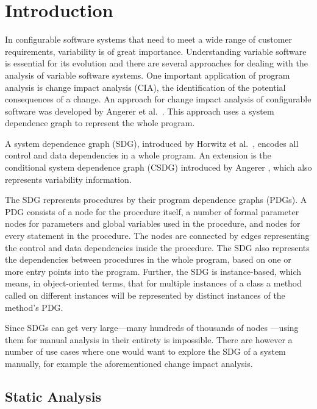 \chapter{Introduction}

In configurable software systems that need to meet a wide range of customer requirements, variability is of great 
importance. Understanding variable software is essential for its evolution and there are several approaches for dealing 
with the analysis of variable software systems. One important application of program analysis is change impact analysis 
(CIA), the identification of the potential consequences of a change. An approach for change impact analysis of 
configurable software was developed by Angerer et al.\ \cite{DBLP:conf/kbse/AngererGPG15}. This approach uses a system 
dependence graph to represent the whole program.

A system dependence graph (SDG), introduced by Horwitz et al.\ \cite{DBLP:journals/toplas/HorwitzRB90}, encodes all 
control and data dependencies in a whole program. An extension is the conditional system dependence graph (CSDG) 
introduced by Angerer \cite{DBLP:conf/splc/AngererPLGG14}, which also represents variability information.

The SDG represents procedures by their program dependence graphs (PDGs). A PDG consists of a node for the 
procedure itself, a number of formal parameter nodes for parameters and global variables used in the procedure, and 
nodes for every statement in the procedure. The nodes are connected by edges representing the control and data 
dependencies inside the procedure. The SDG also represents the dependencies between procedures in the whole program, 
based on one or more entry points into the program. Further, the SDG is instance-based, which means, in object-oriented 
terms, that for multiple instances of a class a method called on different instances will be represented by 
distinct instances of the method's PDG.

Since SDGs can get very large---many hundreds of thousands of nodes 
\cite[sec.~4.3]{DBLP:conf/splc/AngererPLGG14}---using them for manual analysis in their entirety is impossible. There 
are however a number of use cases where one would want to explore the SDG of a system manually, for example the 
aforementioned change impact analysis.


\section{Static Analysis}

